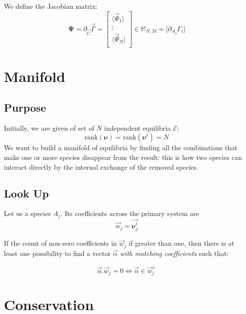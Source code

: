 \documentclass[aps,12pt]{revtex4}
\begin{document}
We define the Jacobian matrix:
\begin{equation}
\bm{\Psi} = \partial_{\vec{C}} \vec{\Gamma} = 
\begin{bmatrix}
	\langle\vec{\Psi}_1\vert\\
	\vdots\\
	\langle\vec{\Psi}_N\vert\\
	\end{bmatrix}
	\in \mathbb{M}_{N,M} = 
	\lbrack \partial_{A_j}\Gamma_i \rbrack
\end{equation}

\section{Manifold}
\subsection{Purpose}
Initially, we are given of set of $N$ independent equilibria $\mathcal{E}$:
\begin{equation}
	\mathrm{rank}(\bm{\nu}) = \mathrm{rank}(\bm{\nu}^t) = N
\end{equation}
We want to build a manifold of equilibria by finding
all the combinations that make one or more species disappear from
the result: this is how two species can interact directly by
the internal exchange of the removed species.
\subsection{Look Up}
Let us a species $A_j$. Its coefficients across the
primary system are
\begin{equation}
	\vec{w}_j = \vec{\bm{\nu}^t_{j}}
\end{equation}

If the count of non-zero coefficients in  $\vec{w}_j$ if greater than one,
then there is at least one possibility to find a vector $\vec{\alpha}$ \emph{with matching coefficients} such
that:

\begin{equation}
	\vec{\alpha}.\vec{w}_j=0 \Leftrightarrow \vec{\alpha} \in \vec{w}_j^\perp
\end{equation}

\section{Conservation}

\end{document}
